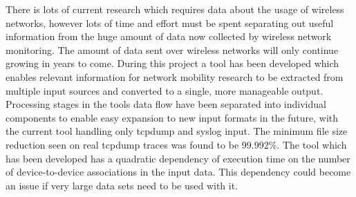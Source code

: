 There is lots of current research which requires data about the usage of wireless networks, however lots of time and effort must be spent separating out useful information from the huge amount of data now collected by wireless network monitoring. The amount of data sent over wireless networks will only continue growing in years to come. During this project a tool has been developed which enables relevant information for network mobility research to be extracted from multiple input sources and converted to a single, more manageable output. Processing stages in the tools data flow have been separated into individual components to enable easy expansion to new input formats in the future, with the current tool handling only tcpdump and syslog input. The minimum file size reduction seen on real tcpdump traces was found to be 99.992\%. The tool which has been developed has a quadratic dependency of execution time on the number of device-to-device associations in the input data. This dependency could become an issue if very large data sets need to be used with it.